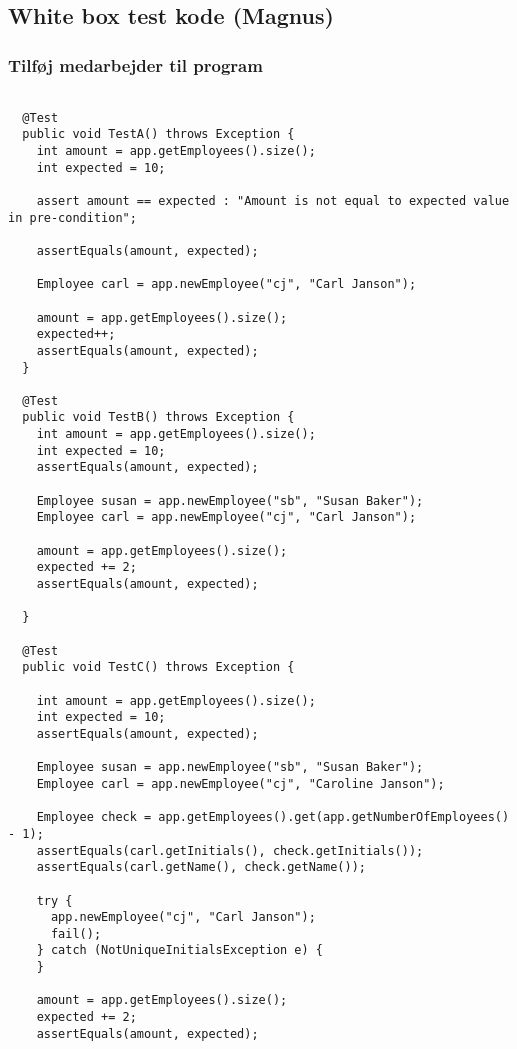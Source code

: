 \subsection{White box test kode (Magnus)}

\subsubsection{Tilføj medarbejder til program}
\begin{lstlisting}

  @Test
  public void TestA() throws Exception {
    int amount = app.getEmployees().size();
    int expected = 10;
    
    assert amount == expected : "Amount is not equal to expected value in pre-condition";
    
    assertEquals(amount, expected);

    Employee carl = app.newEmployee("cj", "Carl Janson");

    amount = app.getEmployees().size();
    expected++;
    assertEquals(amount, expected);
  }

  @Test
  public void TestB() throws Exception {
    int amount = app.getEmployees().size();
    int expected = 10;
    assertEquals(amount, expected); 

    Employee susan = app.newEmployee("sb", "Susan Baker");
    Employee carl = app.newEmployee("cj", "Carl Janson");

    amount = app.getEmployees().size();
    expected += 2;
    assertEquals(amount, expected); 

  }

  @Test
  public void TestC() throws Exception {

    int amount = app.getEmployees().size();
    int expected = 10;
    assertEquals(amount, expected); 

    Employee susan = app.newEmployee("sb", "Susan Baker");
    Employee carl = app.newEmployee("cj", "Caroline Janson");

    Employee check = app.getEmployees().get(app.getNumberOfEmployees() - 1);
    assertEquals(carl.getInitials(), check.getInitials()); 
    assertEquals(carl.getName(), check.getName());

    try {
      app.newEmployee("cj", "Carl Janson");
      fail();
    } catch (NotUniqueInitialsException e) {
    }

    amount = app.getEmployees().size();
    expected += 2;
    assertEquals(amount, expected);


\end{lstlisting}
